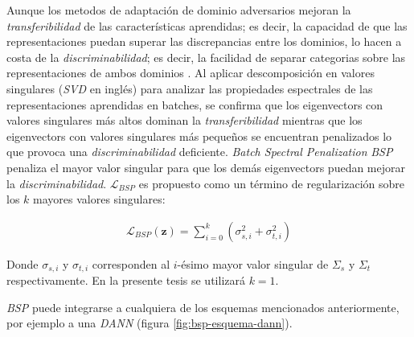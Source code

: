 Aunque los metodos de adaptación de dominio adversarios mejoran la {\it transferibilidad} de las características
aprendidas; es decir, la capacidad de que las representaciones puedan superar las discrepancias entre los dominios, lo
hacen a costa de la {\it discriminabilidad}; es decir, la facilidad de separar categorias sobre las representaciones de
ambos dominios \parencite{chen2019transferability}. Al aplicar descomposición en valores singulares ({\it SVD} en inglés) para analizar
las propiedades espectrales de las representaciones aprendidas en batches, se confirma que los eigenvectors con valores
singulares más altos dominan la {\it transferibilidad} mientras que los eigenvectors con valores singulares más
pequeños se encuentran penalizados lo que provoca una {\it discriminabilidad} deficiente. {\it Batch Spectral
        Penalization} {\it BSP} \parencite{chen2019transferability} penaliza el mayor valor singular para que los demás eigenvectors puedan mejorar la {\it
        discriminabilidad}. $\mathcal{L}_{BSP}$ es propuesto como un término de regularización sobre los $k$ mayores valores
singulares:

\begin{align}
    \mathcal{L}_{BSP}(\mathbf{z}) = \sum_{i=0}^{k} (\sigma_{s, i}^2 + \sigma_{t, i}^2)
    \label{eq:bsp}
\end{align}

Donde $\sigma_{s, i}$ y $\sigma_{t, i}$ corresponden al $i$-ésimo mayor valor singular de $\Sigma_s$ y $\Sigma_t$
respectivamente. En la presente tesis se utilizará $k=1$.

    {\it BSP} puede integrarse a cualquiera de los esquemas mencionados anteriormente, por ejemplo a una {\it DANN} (figura \ref{fig:bsp-esquema-dann}).

